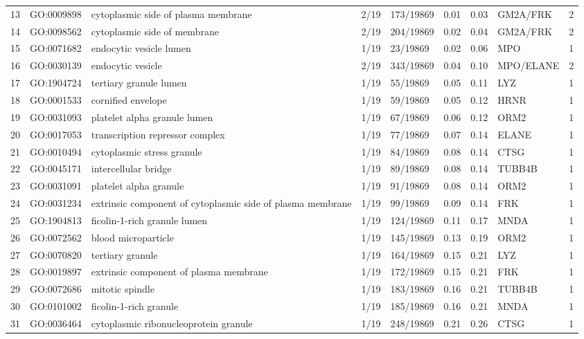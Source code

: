 \begin{table}[ht]
\begin{tabular}{rllllrrlr}
  13 & GO:0009898 & cytoplasmic side of plasma membrane & 2/19 & 173/19869 & 0.01 & 0.03 & GM2A/FRK &   2 \\ 
  14 & GO:0098562 & cytoplasmic side of membrane & 2/19 & 204/19869 & 0.02 & 0.04 & GM2A/FRK &   2 \\ 
  15 & GO:0071682 & endocytic vesicle lumen & 1/19 & 23/19869 & 0.02 & 0.06 & MPO &   1 \\ 
  16 & GO:0030139 & endocytic vesicle & 2/19 & 343/19869 & 0.04 & 0.10 & MPO/ELANE &   2 \\ 
  17 & GO:1904724 & tertiary granule lumen & 1/19 & 55/19869 & 0.05 & 0.11 & LYZ &   1 \\ 
  18 & GO:0001533 & cornified envelope & 1/19 & 59/19869 & 0.05 & 0.12 & HRNR &   1 \\ 
  19 & GO:0031093 & platelet alpha granule lumen & 1/19 & 67/19869 & 0.06 & 0.12 & ORM2 &   1 \\ 
  20 & GO:0017053 & transcription repressor complex & 1/19 & 77/19869 & 0.07 & 0.14 & ELANE &   1 \\ 
  21 & GO:0010494 & cytoplasmic stress granule & 1/19 & 84/19869 & 0.08 & 0.14 & CTSG &   1 \\ 
  22 & GO:0045171 & intercellular bridge & 1/19 & 89/19869 & 0.08 & 0.14 & TUBB4B &   1 \\ 
  23 & GO:0031091 & platelet alpha granule & 1/19 & 91/19869 & 0.08 & 0.14 & ORM2 &   1 \\ 
  24 & GO:0031234 & extrinsic component of cytoplasmic side of plasma membrane & 1/19 & 99/19869 & 0.09 & 0.14 & FRK &   1 \\ 
  25 & GO:1904813 & ficolin-1-rich granule lumen & 1/19 & 124/19869 & 0.11 & 0.17 & MNDA &   1 \\ 
  26 & GO:0072562 & blood microparticle & 1/19 & 145/19869 & 0.13 & 0.19 & ORM2 &   1 \\ 
  27 & GO:0070820 & tertiary granule & 1/19 & 164/19869 & 0.15 & 0.21 & LYZ &   1 \\ 
  28 & GO:0019897 & extrinsic component of plasma membrane & 1/19 & 172/19869 & 0.15 & 0.21 & FRK &   1 \\ 
  29 & GO:0072686 & mitotic spindle & 1/19 & 183/19869 & 0.16 & 0.21 & TUBB4B &   1 \\ 
  30 & GO:0101002 & ficolin-1-rich granule & 1/19 & 185/19869 & 0.16 & 0.21 & MNDA &   1 \\ 
  31 & GO:0036464 & cytoplasmic ribonucleoprotein granule & 1/19 & 248/19869 & 0.21 & 0.26 & CTSG &   1 \\ 

\end{tabular}
\end{table}
